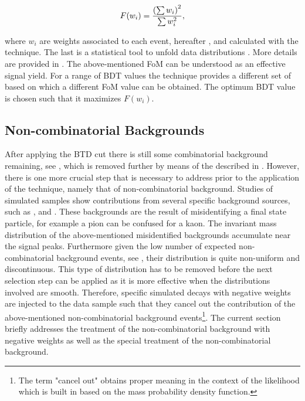\begin{equation}
  \centering
  F(w_i) = \frac{\left(\sum{w_{i}}\right)^2}{\sum{w_{i}^2}},
\label{eqn:fom}
\end{equation}

\noindent where $w_i$ are weights associated to each event, hereafter \sWeights, and calculated with the
\sPlot technique. The last  is a statistical tool to unfold data distributions \cite{splot}. More details are provided
in . The above-mentioned FoM can be understood as an effective signal yield.
For a range of BDT values the \sPlot technique provides a different set of \sWeights based on which a different
FoM value can be obtained. The optimum BDT value is chosen such that it maximizes $F(w_i)$.

\subsection{Non-combinatorial Backgrounds}
\label{peaking_backgrounds}

After applying the BTD cut there is still some combinatorial background remaining, see , which is removed
further by means of the \sWeights described in . However, there is
one more crucial step that is necessary to address prior to the application of the \sPlot technique,
namely that of non-combinatorial background. Studies of simulated samples show contributions from
several specific background sources, such as \BsJpsiKK, \BsJpsipipi and \BdJpsipipi.
These backgrounds are the result of misidentifying a final state particle, for example a pion can
be confused for a kaon. The invariant mass distribution of the above-mentioned misidentified backgrounds
accumulate near the \BJpsiKpi signal peaks. Furthermore given the low number of expected non-combinatorial background events,
see , their distribution is quite non-uniform and discontinuous.
This type of distribution has to be removed before the next selection step can be applied as it is more effective
when the distributions involved are smooth. Therefore, specific simulated decays with negative weights
are injected to the data sample such that they cancel out the contribution of the above-mentioned non-combinatorial background
events\footnote{The term "cancel out" obtains proper meaning in the context of the likelihood which is built
in  based on the mass probability density function.}.
The current section briefly addresses the treatment of the non-combinatorial background with negative weights
as well as the special treatment of the \LbJpsippi non-combinatorial background.

